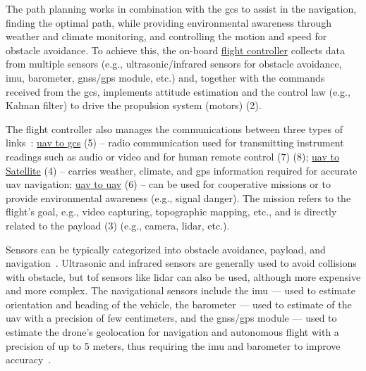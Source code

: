 The path planning works in
combination with the \gls{gcs} to assist in the navigation, finding the optimal
path, while providing environmental awareness through weather and climate
monitoring, and controlling the motion and speed for obstacle avoidance. To
achieve this, the
on-board \underline{flight controller} collects data from multiple sensors
(e.g., ultrasonic/infrared sensors for obstacle avoidance,
\gls{imu}, barometer, \gls{gnss}/\gls{gps} module, etc.) and,
together with the commands received from the \gls{gcs}, implements attitude
estimation and the control law (e.g., Kalman filter) to drive the propulsion
system (motors) (2).

The flight controller also manages the communications
between three types of links~\cite{aggarwal2020UAVPathPlanning}: \underline{\gls{uav} to \gls{gcs}} (5) -- radio
communication used for transmitting instrument readings such as audio or video
and for human remote control (7) (8); \underline{\gls{uav}
  to Satellite} (4) -- carries weather, climate, and \gls{gps} information
  required for accurate \gls{uav} navigation; \underline{\gls{uav} to \gls{uav}}
  (6) -- can be used for cooperative missions or to provide environmental
  awareness (e.g., signal danger). The mission refers to the flight's goal,
  e.g., video capturing, topographic mapping, etc., and is directly related to
  the payload (3) (e.g., camera, \gls{lidar}, etc.).

Sensors can be typically categorized into obstacle avoidance, payload, and
navigation~\cite{VogeltanzFreeSWUAVSurvey2016}. Ultrasonic and infrared sensors are generally used to avoid
collisions with obstacle, but \gls{tof} sensors like \gls{lidar} can also be used,
although more expensive and more complex. The navigational sensors include the
\gls{imu} --- used to estimate orientation and heading of the vehicle, the
barometer --- used to estimate of the \gls{uav} with a precision of few
centimeters, and the \gls{gnss}/\gls{gps} module --- used to estimate the
drone's geolocation for navigation and autonomous flight with a precision of up
to 5 meters, thus requiring the \gls{imu} and barometer to improve accuracy~\cite{ebeidUAVPlatformsSurvey2017}.

